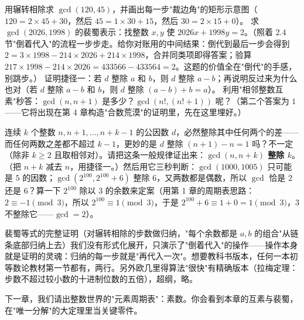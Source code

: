 \begin{dongshou}
\begin{itemize}
  \yisi 用辗转相除求 $\gcd(120, 45)$，并画出每一步"裁边角"的矩形示意图（$120 = 2\times45 + 30$，然后 $45 = 1\times 30 + 15$，然后 $30 = 2\times 15 + 0$）。
  \yier 求 $\gcd(2026, 1998)$ 的裴蜀表示：找整数 $x, y$ 使 $2026x + 1998y = 2$。（照着 2.4 节"倒着代入"的流程一步步走。给你对账用的中间结果：倒代到最后一步会得到 $2 = 3\times 1998 - 214\times 2026 + 214\times 1998$，合并同类项即得答案；验算 $217\times 1998 - 214\times 2026 = 433566 - 433564 = 2$。\checkmark 这题的价值全在"倒代"的手感，别跳步。）
  \yier 证明捷径一：若 $d$ 整除 $a$ 和 $b$，则 $d$ 整除 $a - b$；再说明反过来为什么也对（若 $d$ 整除 $a - b$ 和 $b$，则 $d$ 整除 $(a-b)+b = a$）。
  \yier 利用"相邻整数互素"秒答：$\gcd(n, n+1)$ 是多少？$\gcd(n!, (n!+1))$ 呢？（第二个答案为 $1$——它将出现在第 4 章构造"合数荒漠"的证明里，先在这里埋好。）
\end{itemize}
\end{dongshou}

\begin{shaonao}
连续 $k$ 个整数 $n, n+1, \dots, n+k-1$ 的公因数 $d$，必然整除其中任何两个的差——而任何两数之差都不超过 $k-1$，更妙的是 $d$ 整除 $(n+1) - n = 1$ 吗？不一定（除非 $k \ge 2$ 且取相邻对）。请把这条一般规律证出来：\textbf{$\gcd(n, n+k)$ 整除 $k$}。（把 $n + k$ 减去 $n$，用捷径一。）然后用它三秒判断：$\gcd(1000, 1005)$ 只可能是 $5$ 的因数；$\gcd(2^{100}, 2^{100}+6)$ 整除 $6$，又两数都是偶数，所以 $\gcd$ 恰是 $2$ 还是 $6$？算一下 $2^{100}$ 除以 $3$ 的余数来定案（用第 1 章的周期表思路：$2 \equiv -1 \pmod 3$，所以 $2^{100} \equiv 1 \pmod 3$，于是 $2^{100} + 6 \equiv 1 + 0 = 1 \pmod 3$，$3$ 不整除它——$\gcd = 2$）。
\end{shaonao}

\begin{chengshi}
裴蜀等式的完整证明（对辗转相除的步数做归纳，"每个余数都是 $a,b$ 的组合"从链条底部归纳上去）我们没有形式化展开，只演示了"倒着代入"的操作——操作本身就是证明的灵魂：归纳的每一步就是"再代入一次"。想要教科书版本，任何一本初等数论教材第一节都有，两行。另外欧几里得算法"很快"有精确版本（拉梅定理：步数不超过较小数的十进制位数的五倍），超纲，略。
\end{chengshi}

下一章，我们请出整数世界的"元素周期表"：素数。你会看到本章的互素与裴蜀，在"唯一分解"的大定理里当关键零件。
